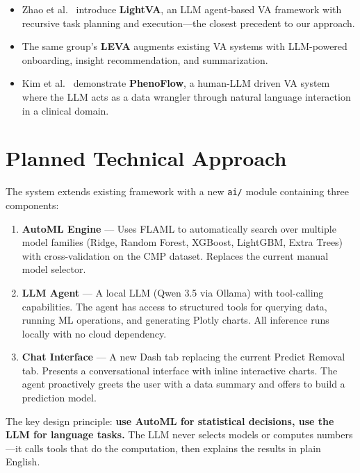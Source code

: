 \documentclass[11pt]{article}
\begin{document}
\begin{itemize}[noitemsep]
  \item Zhao et al.\ \cite{lightva2024} introduce \textbf{LightVA}, an LLM agent-based VA framework with recursive task planning and execution---the closest precedent to our approach.
  \item The same group's \textbf{LEVA} \cite{leva2024} augments existing VA systems with LLM-powered onboarding, insight recommendation, and summarization.
  \item Kim et al.\ \cite{phenoflow2024} demonstrate \textbf{PhenoFlow}, a human-LLM driven VA system where the LLM acts as a data wrangler through natural language interaction in a clinical domain.
\end{itemize}

\section{Planned Technical Approach}

The system extends existing framework with a new \texttt{ai/} module containing three components:

\begin{enumerate}[noitemsep]
  \item \textbf{AutoML Engine} --- Uses FLAML to automatically search over multiple model families (Ridge, Random Forest, XGBoost, LightGBM, Extra Trees) with cross-validation on the CMP dataset. Replaces the current manual model selector.

  \item \textbf{LLM Agent} --- A local LLM (Qwen 3.5 via Ollama) with tool-calling capabilities. The agent has access to structured tools for querying data, running ML operations, and generating Plotly charts. All inference runs locally with no cloud dependency.

  \item \textbf{Chat Interface} --- A new Dash tab replacing the current Predict Removal tab. Presents a conversational interface with inline interactive charts. The agent proactively greets the user with a data summary and offers to build a prediction model.
\end{enumerate}

The key design principle: \textbf{use AutoML for statistical decisions, use the LLM for language tasks.} The LLM never selects models or computes numbers---it calls tools that do the computation, then explains the results in plain English.
\end{document}
